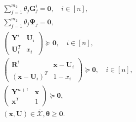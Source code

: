 \documentclass[opre,nonblindrev]{informs3} %
\begin{document}
\begin{appendices}
\begin{theorem}
\begin{subequations}
\begin{align}
                &\quad \sum_{j=1}^{m_2} \theta_j \boldsymbol{G}_j^i = \boldsymbol{0}, \quad i \in [n], \label{eq:gersh_degree3_k} \\ 
                &\quad \sum_{j=1}^{m_2} \theta_j \boldsymbol{\Psi}_j = \boldsymbol{0}, \label{eq:gersh_degree3_l} \\
                &\quad \begin{pmatrix}
                        \boldsymbol{Y}^i & \boldsymbol{U}_i \\
                        \boldsymbol{U}_i^T & x_i
                   \end{pmatrix} \succeq \boldsymbol{0}, \quad i \in [n], \label{eq:gersh_degree3_m} \\ 
               &\quad \begin{pmatrix}
                        \boldsymbol{R}^i & \boldsymbol{x}-\boldsymbol{U}_i \\
                        \left(\boldsymbol{x}-\boldsymbol{U}_i\right)^T & 1-x_i
                   \end{pmatrix} \succeq \boldsymbol{0}, \quad i \in [n], \label{eq:gersh_degree3_n} \\ 
             &\quad \begin{pmatrix}
                        \boldsymbol{Y}^{n+1} & \boldsymbol{x} \\
                        \boldsymbol{x}^T & 1
                   \end{pmatrix} \succeq \boldsymbol{0}, \label{eq:gersh_degree3_o} \\
              &\quad \left( \boldsymbol{x}, \boldsymbol{U} \right) \in \overline{\mathcal{X}}, \boldsymbol{\theta} \ge \boldsymbol{0}. \label{eq:gersh_degree3_p}
			\end{align}
\end{subequations}
\end{theorem} 


\end{appendices}
\end{document}
